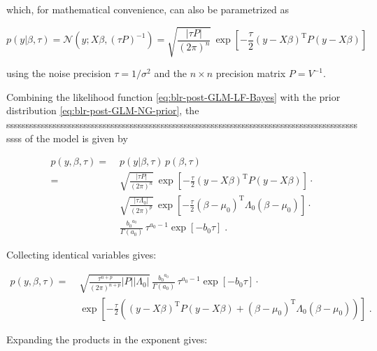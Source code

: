 \documentclass[a4paper,12pt]{book}
\begin{document}
which, for mathematical convenience, can also be parametrized as

\begin{equation} \label{eq:blr-post-GLM-LF-Bayes}
p(y|\beta,\tau) = \mathcal{N}(y; X \beta, (\tau P)^{-1}) = \sqrt{\frac{|\tau P|}{(2 \pi)^n}} \, \exp\left[ -\frac{\tau}{2} (y-X\beta)^\mathrm{T} P (y-X\beta) \right]
\end{equation}

using the noise precision $\tau = 1/\sigma^2$ and the $n \times n$ precision matrix $P = V^{-1}$.

\vspace{1em}
Combining the likelihood function \eqref{eq:blr-post-GLM-LF-Bayes} with the prior distribution \eqref{eq:blr-post-GLM-NG-prior}, the sssssssssssssssssssssssssssssssssssssssssssssssssssssssssssssssssssssssssssssssssssssssssssssss of the model is given by

\begin{equation} \label{eq:blr-post-GLM-NG-JL-s1}
\begin{split}
p(y,\beta,\tau) = \; & p(y|\beta,\tau) \, p(\beta,\tau) \\
= \; & \sqrt{\frac{|\tau P|}{(2 \pi)^n}} \, \exp\left[ -\frac{\tau}{2} (y-X\beta)^\mathrm{T} P (y-X\beta) \right] \cdot \\
& \sqrt{\frac{|\tau \Lambda_0|}{(2 \pi)^p}} \, \exp\left[ -\frac{\tau}{2} (\beta-\mu_0)^\mathrm{T} \Lambda_0 (\beta-\mu_0) \right] \cdot \\
& \frac{ {b_0}^{a_0}}{\Gamma(a_0)} \, \tau^{a_0-1} \exp[-b_0 \tau] \; .
\end{split}
\end{equation}

Collecting identical variables gives:

\begin{equation} \label{eq:blr-post-GLM-NG-JL-s2}
\begin{split}
p(y,\beta,\tau) = \; & \sqrt{\frac{\tau^{n+p}}{(2 \pi)^{n+p}} |P| |\Lambda_0|} \, \frac{ {b_0}^{a_0}}{\Gamma(a_0)} \, \tau^{a_0-1} \exp[-b_0 \tau] \cdot \\
& \exp\left[ -\frac{\tau}{2} \left( (y-X\beta)^\mathrm{T} P (y-X\beta) + (\beta-\mu_0)^\mathrm{T} \Lambda_0 (\beta-\mu_0) \right) \right] \; .
\end{split}
\end{equation}

Expanding the products in the exponent gives:
\end{document}
